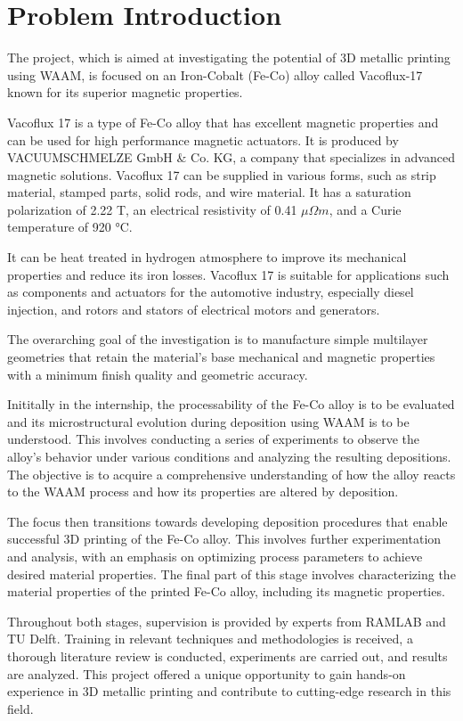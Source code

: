 \section{Problem Introduction}

The project, which is aimed at investigating the potential of 3D metallic printing using WAAM, is focused on an Iron-Cobalt (Fe-Co) alloy called Vacoflux-17 known for its superior magnetic properties.

Vacoflux 17 is a type of Fe-Co alloy that has excellent magnetic properties and can be used for high performance magnetic actuators. It is produced by VACUUMSCHMELZE GmbH \& Co. KG, a company that specializes in advanced magnetic solutions.
Vacoflux 17 can be supplied in various forms, such as strip material, stamped parts, solid rods, and wire material. It has a saturation polarization of 2.22 T, an electrical resistivity of 0.41 $\mu \Omega m$, and a Curie temperature of 920 °C.

It can be heat treated in hydrogen atmosphere to improve its mechanical properties and reduce its iron losses. Vacoflux 17 is suitable for applications such as components and actuators for the automotive industry, especially diesel injection, and rotors and stators of electrical motors and generators.

The overarching goal of the investigation is to manufacture simple multilayer geometries that retain the material's base mechanical and magnetic properties with a minimum finish quality and geometric accuracy.

Inititally in the internship, the processability of the Fe-Co alloy is to be evaluated and its microstructural evolution during deposition using WAAM is to be understood. This involves conducting a series of experiments to observe the alloy's behavior under various conditions and analyzing the resulting depositions. The objective is to acquire a comprehensive understanding of how the alloy reacts to the WAAM process and how its properties are altered by deposition.

The focus then transitions towards developing deposition procedures that enable successful 3D printing of the Fe-Co alloy. This involves further experimentation and analysis, with an emphasis on optimizing process parameters to achieve desired material properties. The final part of this stage involves characterizing the material properties of the printed Fe-Co alloy, including its magnetic properties.

Throughout both stages, supervision is provided by experts from RAMLAB and TU Delft. Training in relevant techniques and methodologies is received, a thorough literature review is conducted, experiments are carried out, and results are analyzed. This project offered a unique opportunity to gain hands-on experience in 3D metallic printing and contribute to cutting-edge research in this field.

